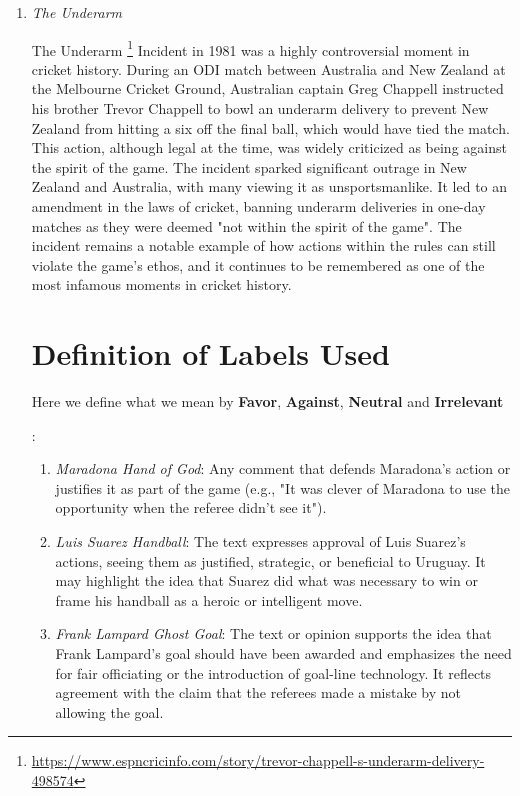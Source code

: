 \documentclass{article}
\begin{document}
\begin{enumerate}
\item \textit{The Underarm}

The Underarm \footnote{\url{https://www.espncricinfo.com/story/trevor-chappell-s-underarm-delivery-498574}} Incident in 1981 was a highly controversial moment in cricket history. During an ODI match between Australia and New Zealand at the Melbourne Cricket Ground, Australian captain Greg Chappell instructed his brother Trevor Chappell to bowl an underarm delivery to prevent New Zealand from hitting a six off the final ball, which would have tied the match. This action, although legal at the time, was widely criticized as being against the spirit of the game. The incident sparked significant outrage in New Zealand and Australia, with many viewing it as unsportsmanlike. It led to an amendment in the laws of cricket, banning underarm deliveries in one-day matches as they were deemed "not within the spirit of the game". The incident remains a notable example of how actions within the rules can still violate the game's ethos, and it continues to be remembered as one of the most infamous moments in cricket history.

\section{Definition of Labels Used}

Here we define what we mean by \textbf{Favor}, \textbf{Against}, \textbf{Neutral} and \textbf{Irrelevant}

: 

\begin{enumerate}
    \item \textit{Maradona Hand of God}: Any comment that defends Maradona's action or justifies it as part of the game (e.g., "It was clever of Maradona to use the opportunity when the referee didn’t see it").

    \item \textit{Luis Suarez Handball}: The text expresses approval of Luis Suarez's actions, seeing them as justified, strategic, or beneficial to Uruguay. It may highlight the idea that Suarez did what was necessary to win or frame his handball as a heroic or intelligent move.


    \item \textit{Frank Lampard Ghost Goal}:  The text or opinion supports the idea that Frank Lampard's goal should have been awarded and emphasizes the need for fair officiating or the introduction of goal-line technology. It reflects agreement with the claim that the referees made a mistake by not allowing the goal.
    

\end{enumerate}
\end{enumerate}
\end{document}

